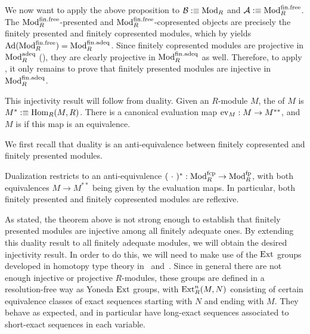 We now want to apply the above proposition to $\mathcal{B} :\equiv \textup{Mod}_{R}$ and $\mathcal{A} :\equiv \textup{Mod}_{R}^{\mathrm{fin.free}}$.
The $\textup{Mod}_{R}^{\mathrm{fin.free}}$-presented and $\textup{Mod}_{R}^{\mathrm{fin.free}}$-copresented objects are precisely the finitely presented and finitely copresented modules, which by  yields $\textup{Ad}(\textup{Mod}_{R}^{\mathrm{fin.free}}) = \textup{Mod}_{R}^{\mathrm{fin.adeq}}$.
Since finitely copresented modules are projective in $\textup{Mod}_{R}^{\mathrm{adeq}}$ (), they are clearly projective in $\textup{Mod}_{R}^{\mathrm{fin.adeq}}$ as well.
Therefore, to apply , it only remains to prove that finitely presented modules are injective in $\textup{Mod}_{R}^{\mathrm{fin.adeq}}$.

This injectivity result will follow from duality.
Given an $R$-module $M$, the  of $M$ is $M^\ast :\equiv \mathrm{Hom}_R(M,R)$.
There is a canonical evaluation map $\mathrm{ev}_M : M \to M^{\ast\ast}$, and
$M$ is  if this map is an equivalence.

We first recall that duality is an anti-equivalence between finitely copresented and finitely presented modules.



\begin{theorem}\label{thm:lin-adeq-dual}
  Dualization restricts to an anti-equivalence $(\ \cdot\ )^\ast : \textup{Mod}_{R}^{\mathrm{fcp}} \rightarrow \textup{Mod}_{R}^{\mathrm{fp}}$,
  with both equivalences $M \to M^{\ast\ast}$ being given by the evaluation maps.
  In particular, both finitely presented and finitely copresented modules are reflexive.
  \earlyqed
\end{theorem}

As stated, the theorem above is not strong enough to establish that finitely presented modules are injective among all finitely adequate ones.
By extending this duality result to all finitely adequate modules, we will obtain the desired injectivity result.
In order to do this, we will need to make use of the $\mathrm{Ext}$ groups developed
in homotopy type theory in~\cite{ext-groups-in-hott} and~\cite{formalising-yoneda-ext}.
Since in general there are not enough injective or projective $R$-modules,
these groups are defined in a resolution-free way as Yoneda $\mathrm{Ext}$ groups,
with $\mathrm{Ext}_R^n(M, N)$ consisting of certain equivalence classes of exact
sequences starting with $N$ and ending with $M$.
They behave as expected, and in particular have long-exact sequences associated
to short-exact sequences in each variable.

